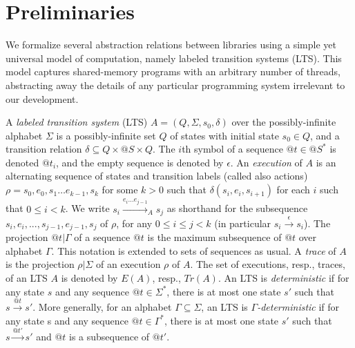 \section{Preliminaries}
\vspace{-2mm}
We formalize several abstraction relations between libraries using a simple
yet universal model of computation, namely labeled transition systems (LTS).
This model captures shared-memory programs with an arbitrary number of threads,
abstracting away the details of any particular programming system irrelevant to
our development.

A \emph{labeled transition system} (LTS) $A=(Q,\Sigma, s_0, \delta)$ over the 
possibly-infinite alphabet $\Sigma$ is a possibly-infinite set $Q$ of states with
initial state $s_0 \in Q$, and a transition relation $\delta \subseteq Q \times @S \times
Q$. The $i$th symbol of a sequence $@t \in @S^*$ is denoted $@t_i$, and the empty
sequence is denoted by $\epsilon$.
An \emph{execution} of $A$ is an alternating sequence of states and transition labels (called also actions)
$\rho = s_0, e_0,s_1\ldots e_{k-1},s_k$ for some $k>0$ such that $\delta(s_i, e_i, s_{i+1})$
for each $i$ such that $0\leq i<k$. We write $s_i\xrightarrow{e_i\ldots e_{j-1}}_A s_j$ as shorthand for 
the subsequence $s_i,e_i,...,s_{j-1},e_{j-1},s_j$ of $\rho$, for any $0\leq i\leq j <k$
(in particular $s_i\xrightarrow{\epsilon}s_i$).
The projection $@t| \Gamma$ of a sequence $@t$ is the maximum subsequence of $@t$ over
 alphabet $\Gamma$. This notation is extended to sets of sequences as usual.
A \emph{trace} of $A$ is the projection $\rho | \Sigma$ of an execution $\rho$ of $A$. 
The set of executions, resp., traces, of an LTS $A$ is denoted by $E(A)$, resp., $Tr(A)$.
An LTS is \emph{deterministic} if for any state $s$ and any sequence $@t\in \Sigma^*$, there is at most
one state $s'$ such that $s\xrightarrow{@t}s'$. More generally, for an alphabet $\Gamma\subseteq \Sigma$,
an LTS is \emph{$\Gamma$-deterministic} if for any state s and any sequence $@t\in \Gamma^*$, there
is at most one state $s'$ such that $s\xrightarrow{@t'}s'$ and $@t$ is a subsequence of $@t'$.

\vspace{-3.5mm}
